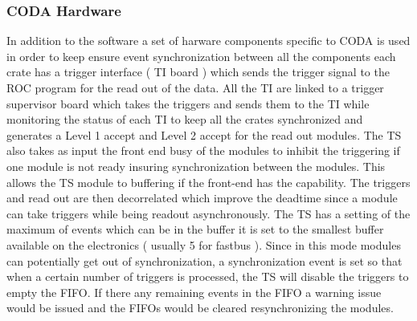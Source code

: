 \documentclass{article}
\begin{document}
\subsubsection{CODA Hardware}
In addition to the software a set of harware components specific to CODA is used in order to keep ensure event synchronization between all the components each crate has a trigger interface ( TI board ) which sends the trigger signal to the ROC program for the read out of the data. All the TI are linked to a trigger supervisor board which takes the triggers and sends them to the TI while monitoring the status of each TI to keep all the crates synchronized and generates a Level 1 accept and Level 2 accept for the read out modules. The TS also takes as input the front end busy of the modules to inhibit the triggering if one module is not ready insuring synchronization between the modules.
This allows the TS module to buffering if the front-end has the capability. The triggers and read out are then decorrelated which improve the deadtime since a module can take triggers while being readout asynchronously. The TS has a setting of the maximum of events which can be in the buffer it is set to the smallest buffer available on the electronics ( usually 5 for fastbus ). Since in this mode modules can potentially get out of synchronization, a synchronization event is set so that when a certain number of triggers is processed, the TS will disable the triggers to empty the FIFO. If there any remaining events in the FIFO a warning issue would be issued and the FIFOs would be cleared resynchronizing the modules.
\end{document}
